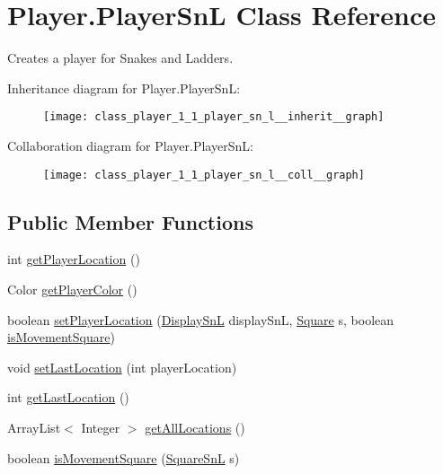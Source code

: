 \hypertarget{class_player_1_1_player_sn_l}{}\section{Player.\+Player\+Sn\+L Class Reference}
\label{class_player_1_1_player_sn_l}


Creates a player for Snakes and Ladders.  




Inheritance diagram for Player.\+Player\+Sn\+L\+:\nopagebreak
\begin{figure}[H]
\begin{center}
\leavevmode
\texttt{[image: class\_player\_1\_1\_player\_sn\_l\_\_inherit\_\_graph]}
\end{center}
\end{figure}


Collaboration diagram for Player.\+Player\+Sn\+L\+:\nopagebreak
\begin{figure}[H]
\begin{center}
\leavevmode
\texttt{[image: class\_player\_1\_1\_player\_sn\_l\_\_coll\_\_graph]}
\end{center}
\end{figure}
\subsection*{Public Member Functions}
\begin{DoxyCompactItemize}
\item 
int \hyperlink{class_player_1_1_player_sn_l_a36a358c20cb0f45cc87e7975befebbcc}{get\+Player\+Location} ()
\item 
Color \hyperlink{class_player_1_1_player_sn_l_a7d5b12033c99b19fda1be39e30470b2c}{get\+Player\+Color} ()
\item 
boolean \hyperlink{class_player_1_1_player_sn_l_a0b10f61660837878f6d3b9306b9cc8f3}{set\+Player\+Location} (\hyperlink{class_display_1_1_display_sn_l}{Display\+Sn\+L} display\+Sn\+L, \hyperlink{class_square_1_1_square}{Square} s, boolean \hyperlink{class_player_1_1_player_sn_l_a643b8e902d4c0701ead60eea0099107b}{is\+Movement\+Square})
\item 
void \hyperlink{class_player_1_1_player_sn_l_a31b9b469c7aabb27b5da8c38699587f3}{set\+Last\+Location} (int player\+Location)
\item 
int \hyperlink{class_player_1_1_player_sn_l_ac13c20e8675be07704620e1e54e714cc}{get\+Last\+Location} ()
\item 
Array\+List$<$ Integer $>$ \hyperlink{class_player_1_1_player_sn_l_a2f2c8d17959786a2c6ed0770fdf2d4df}{get\+All\+Locations} ()
\item 
boolean \hyperlink{class_player_1_1_player_sn_l_a643b8e902d4c0701ead60eea0099107b}{is\+Movement\+Square} (\hyperlink{class_square_1_1_square_sn_l}{Square\+Sn\+L} s)
\end{DoxyCompactItemize}
